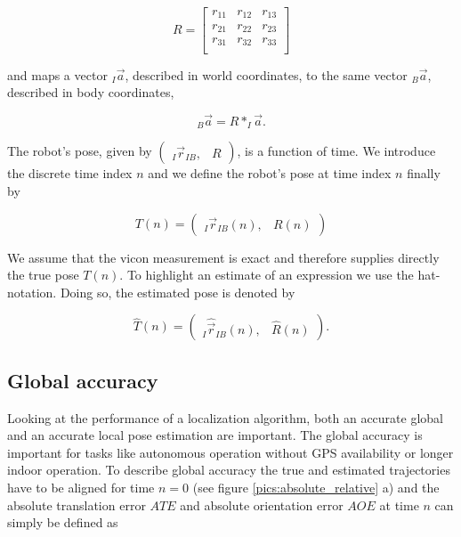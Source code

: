 \begin{equation}
       R = \left[ \begin{array}{ccc}
		r_{11} & r_{12}	& r_{13} \\
		r_{21} & r_{22} 	& r_{23} \\
		r_{31} & r_{32}	& r_{33} \\
		\end{array} \right]
\end{equation}

and maps a vector $_I \vec{a} $, described in world coordinates, to the same vector $_B \vec{a} $, described in body coordinates,

\begin{equation}
	_B \vec{a} = R * _I \vec{a} .
\end{equation}


The robot's pose, given by $ \left( \begin{array}{cc} _I \vec{r}_{IB}, & R \end{array} \right) $, is a function of time. We introduce the discrete time index $n$ and we define the robot's pose at time index $n$ finally by 

\begin{equation}
	T(n) = \left( \begin{array}{cc} _I \vec{r}_{IB}(n), & R(n) \end{array} \right)
\end{equation}

We assume that the vicon measurement is exact and therefore supplies directly the true pose $T(n)$. To highlight an estimate of an expression we use the hat-notation. Doing so, the estimated pose is denoted by

\begin{equation}
	\hat{T}(n) = \left( \begin{array}{cc} _I \hat{\vec{r}}_{IB}(n), & \hat{R}(n) \end{array} \right) .
\end{equation}


\subsection{Global accuracy}
\label{sec:global}

Looking at the performance of a localization algorithm, both an accurate global and an accurate local pose estimation are important. The global accuracy is important for tasks like autonomous operation without GPS availability or longer indoor operation. To describe global accuracy the true and estimated trajectories have to be aligned for time $n=0$ (see figure \ref{pics:absolute_relative} a) and the absolute translation error $ATE$ and absolute orientation error $AOE$ at time $n$ can simply be defined as

